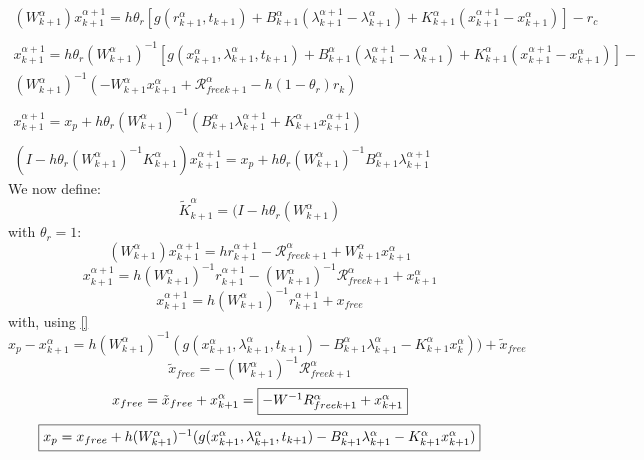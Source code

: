 \begin{equation}
   \begin{array}{l}
    (W^{\alpha}_{k+1})x^{\alpha+1}_{k+1} = h \theta _r \left[g(r^{\alpha}_{k+1},t_{k+1}) +
    B^{\alpha}_{k+1} (\lambda^{\alpha+1}_{k+1} - \lambda^{\alpha}_{k+1})+K^{\alpha}_{k+1}
    (x^{\alpha+1}_{k+1} - x^{\alpha}_{k+1}) \right ] -r_c \\ \\
     x^{\alpha+1}_{k+1} = h\theta _r(W^{\alpha}_{k+1} )^{-1}\left[g(x^{\alpha}_{k+1},\lambda^{\alpha}_{k+1},t_{k+1}) +
    B^{\alpha}_{k+1} (\lambda^{\alpha+1}_{k+1} - \lambda^{\alpha}_{k+1})+K^{\alpha}_{k+1}
    (x^{\alpha+1}_{k+1} - x^{\alpha}_{k+1}) \right ] - \\(W^{\alpha}_{k+1} )^{-1}(- W^{\alpha}_{k+1} x^{\alpha}_{k+1} + \mathcal R_{free k+1} ^{\alpha} - h(1-\theta_r)r_k)\\ \\
    x^{\alpha+1}_{k+1} =  x_p + h \theta _r (W^{\alpha}_{k+1})^{-1}
    (B^{\alpha}_{k+1} \lambda^{\alpha+1}_{k+1}+ K^{\alpha}_{k+1} x^{\alpha+1}_{k+1}) \\ \\
    (I-h \theta _r (W^{\alpha}_{k+1})^{-1}K^{\alpha}_{k+1})x^{\alpha+1}_{k+1}=x_p + h \theta _r (W^{\alpha}_{k+1})^{-1}    B^{\alpha}_{k+1} \lambda^{\alpha+1}_{k+1}

   \end{array}
\end{equation}
We now define:
\[\tilde K^{\alpha}_{k+1}=(I-h \theta _r (W^{\alpha}_{k+1})\]
with $\theta _r =1$:
\[(W^{\alpha}_{k+1} )x^{\alpha+1}_{k+1}= hr^{\alpha+1}_{k+1}- \mathcal R_{free k+1} ^{\alpha}+W^{\alpha}_{k+1}x^{\alpha}_{k+1}\]
\[x^{\alpha+1}_{k+1}= h( W^{\alpha}_{k+1})^{-1}r^{\alpha+1}_{k+1}-
( W^{\alpha}_{k+1})^{-1} \mathcal R_{free k+1} ^{\alpha}+x^{\alpha}_{k+1}\]
\[x^{\alpha+1}_{k+1}= h( W^{\alpha}_{k+1})^{-1}r^{\alpha+1}_{k+1}+x_{free}\]
with, using \ref{}
\begin{equation}
x_p-x^{\alpha}_{k+1}=h(
W^{\alpha}_{k+1})^{-1}(g(x^{\alpha}_{k+1},\lambda^{\alpha}_{k+1},t_{k+1})-B^{\alpha}_{k+1}
\lambda^{\alpha}_{k+1}-K^{\alpha}_{k+1} x^{\alpha}_{k}))+\tilde x_{free}
\end{equation}
\[    \tilde x_{free}= -( W^{\alpha}_{k+1})^{-1} \mathcal R _{free k+1} ^{\alpha} \]
      \[x_{free} = \tilde x_{free} + x^{\alpha}_{k+1}=\fbox{$- W^{-1}R_{free k+1} ^{\alpha} + x^{\alpha}_{k+1}$}\]
\[ \fbox{$x_p  = x_{free} + h ( W^{\alpha}_{k+1})^{-1}( g(x ^{\alpha}_{k+1},\lambda ^{\alpha}_{k+1},t_{k+1}) -
      B^{\alpha}_{k+1} \lambda^{\alpha}_{k+1}-K^{\alpha}_{k+1} x^{\alpha}_{k+1} )$} \]


